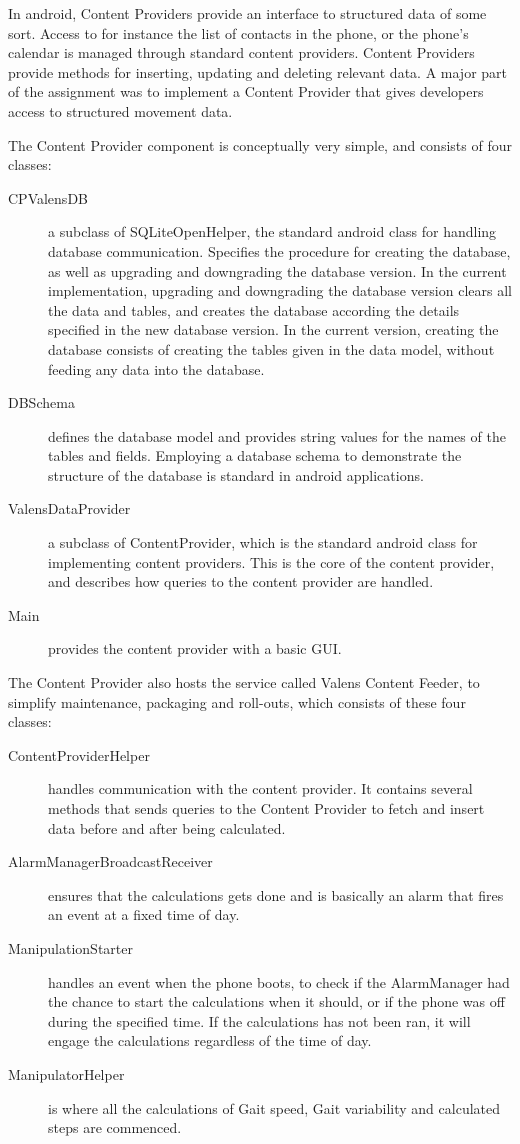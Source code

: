 In android, Content Providers provide an interface to structured data of some sort. Access to for instance the list of contacts in the phone, or the phone's calendar is managed through standard content providers. Content Providers provide methods for inserting, updating and deleting relevant data. A major part of the assignment was to implement a Content Provider that gives developers access to structured movement data.

The Content Provider component is conceptually very simple, and consists of four classes:
\begin{description}
\item[CPValensDB]
a subclass of SQLiteOpenHelper, the standard android class for handling database communication. Specifies the procedure for creating the database, as well as upgrading and downgrading the database version. In the current implementation, upgrading and downgrading the database version clears all the data and tables, and creates the database according the details specified in the new database version. In the current version, creating the database consists of creating the tables given in the data model, without feeding any data into the database.
\item[DBSchema]
defines the database model and provides string values for the names of the tables and fields. Employing a database schema to demonstrate the structure of the database is standard in android applications.
\item[ValensDataProvider]
a subclass of ContentProvider, which is the standard android class for implementing content providers. This is the core of the content provider, and describes how queries to the content provider are handled.
\item[Main]
provides the content provider with a basic GUI.
\end{description}
\label{def:contentfeeder}
The Content Provider also hosts the service called Valens Content Feeder, to simplify maintenance, packaging and roll-outs, which consists of these four classes:
\begin{description}
\item[ContentProviderHelper] handles communication with the content provider. It contains several methods that sends queries to the Content Provider to fetch and insert data before and after being calculated.
\item[AlarmManagerBroadcastReceiver] ensures that the calculations gets done and is basically an alarm that fires an event at a fixed time of day.
\item[ManipulationStarter] handles an event when the phone boots, to check if the AlarmManager had the chance to start the calculations when it should, or if the phone was off during the specified time. If the calculations has not been ran, it will engage the calculations regardless of the time of day.
\item[ManipulatorHelper] is where all the calculations of Gait speed, Gait variability and calculated steps are commenced.
\end{description}

